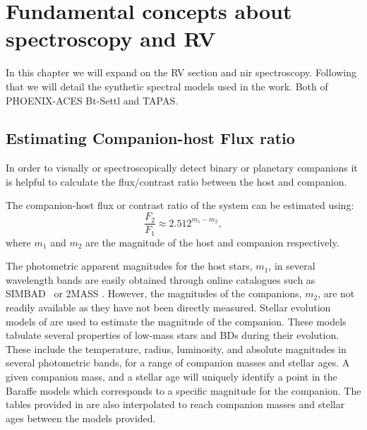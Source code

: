 
\chapter{Fundamental concepts about spectroscopy and RV}
\label{cha:concepts}

In this chapter we will expand on the RV section and nir spectroscopy. Following that we will detail the synthetic spectral models used in the work. Both of PHOENIX-ACES Bt-Settl and TAPAS.









\section{Estimating Companion-host Flux ratio}
\label{sec:compaion_flux_ratio}
In order to visually or spectroscopically detect binary or planetary companions it is helpful to calculate the flux/contrast ratio between the host and companion.

The companion-host flux or contrast ratio of the system can be estimated using:
\begin{equation}
\frac{F_{2}}{F_{1}} \approx 2.512^{m_{1} - m_{2}}, \label{eqn:mag_flux_ratios}
\end{equation}
where \(m_{1}\) and \(m_{2}\) are the magnitude of the host and companion respectively.

The photometric apparent magnitudes for the host stars, \(m_{1}\), in several wavelength bands are easily obtained through online catalogues such as {SIMBAD}~\citep{wenger_simbad_2000} or {2MASS} \citep{skrutskie_two_2006}.
However, the magnitudes of the companions, \(m_{2}\), are not readily available as they have not been directly measured.
Stellar evolution models of \citet{baraffe_evolutionary_2003, baraffe_new_2015} are used to estimate the magnitude of the companion.
These models tabulate several properties of low-mass stars and BDs during their evolution.
These include the temperature, radius, luminosity, and absolute magnitudes in several photometric bands, for a range of companion masses and stellar ages.
A given companion mass, and a stellar age will uniquely identify a point in the Baraffe models which corresponds to a specific magnitude for the companion.
The tables provided in \citet{baraffe_evolutionary_2003, baraffe_new_2015} are also interpolated to reach companion masses and stellar ages between the models provided.

